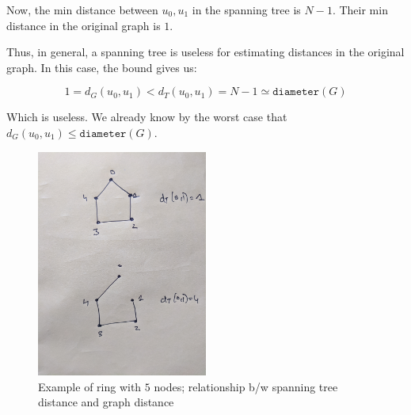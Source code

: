 \documentclass{article}
\begin{document}
Now, the min distance between $u_0, u_1$ in the spanning tree is $N-1$. Their
min distance in the original graph is $1$. 

Thus, in general, a spanning tree is useless for estimating distances in
the original graph. In this case, the bound gives us:

$$
1 = d_G(u_0, u_1) < d_T(u_0, u_1) = N - 1 \simeq \texttt{diameter}(G)
$$

Which is useless. We already know by the worst case that $d_G(u_0, u_1) \leq \texttt{diameter}(G)$.

\begin{figure}[h]
\centering
\includegraphics[width=0.5\textwidth]{graph-spanning-tree.jpg}
\caption{Example of ring with $5$ nodes; relationship b/w spanning tree distance and graph distance}
\end{figure}
\end{document}
